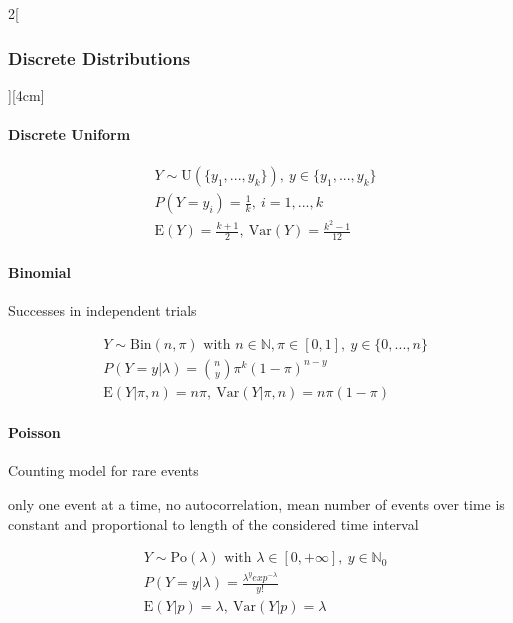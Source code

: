 \documentclass[8pt]{extarticle}
\begin{document}
\begin{multicols}{2}[\subsubsection{Discrete Distributions}][4cm]

  \paragraph{Discrete Uniform}
  
    \begin{align*}
    & Y \sim \mathrm{U}(\{y_1, ..., y_k\}),\: y \in \{y_1, ..., y_k\} \\
    & P(Y=y_i) =\frac{1}{k},\: i = 1, ...,k \\
    & \mathrm{E}(Y) = \frac{k+1}{2} ,\: \mathrm{Var}(Y) = \frac{k^2 - 1}{12}
  \end{align*}
  
    \paragraph{Binomial}
  Successes in independent trials 

  \begin{align*}
    & Y \sim \mathrm{Bin}(n, \pi) \text{ with } n \in \mathbb{N}, \pi \in \left[0,1\right] ,\: y \in \{0, ..., n\} \\
    & P(Y=y|\lambda) = \binom{n}{y}\pi^k(1-\pi)^{n-y} \\
    & \mathrm{E}(Y|\pi,n) = n\pi ,\: \mathrm{Var}(Y|\pi,n) = n\pi(1-\pi)
  \end{align*}

  \paragraph{Poisson}
  Counting model for rare events

\noindent only one event at a time, no autocorrelation, mean number of events over time is constant and proportional to length of the considered time interval 

  \begin{align*}
    & Y \sim \mathrm{Po}(\lambda) \text{ with } \lambda \in \left[ 0, + \infty \right] ,\: y \in \mathbb{N}_0 \\
    & P(Y=y|\lambda) =\frac{\lambda^y exp^{-\lambda}}{y!} \\
    & \mathrm{E}(Y|p) = \lambda ,\: \mathrm{Var}(Y|p) = \lambda
  \end{align*}


\end{multicols}
\end{document}
